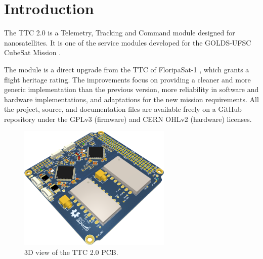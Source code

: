 %
%
%
%
%

%
%
%
%
%


\chapter{Introduction} \label{ch:introduction}

The TTC 2.0 is a Telemetry, Tracking and Command module designed for nanosatellites. It is one of the service modules developed for the GOLDS-UFSC CubeSat Mission \cite{floripasat2}.

The module is a direct upgrade from the TTC of FloripaSat-1 \cite{ttc-fsat}, which grants a flight heritage rating. The improvements focus on providing a cleaner and more generic implementation than the previous version, more reliability in software and hardware implementations, and adaptations for the new mission requirements. All the project, source, and documentation files are available freely on a GitHub repository \cite{ttc2-repo} under the GPLv3 (firmware) and CERN OHLv2 (hardware) licenses.

\begin{figure}[!h]
	\begin{center}
		\includegraphics[width=0.65\textwidth]{figures/ttc2_pcb_3d.png}
		\caption{3D view of the TTC 2.0 PCB.}
		\label{fig:pcb-3d}
	\end{center}
\end{figure}

